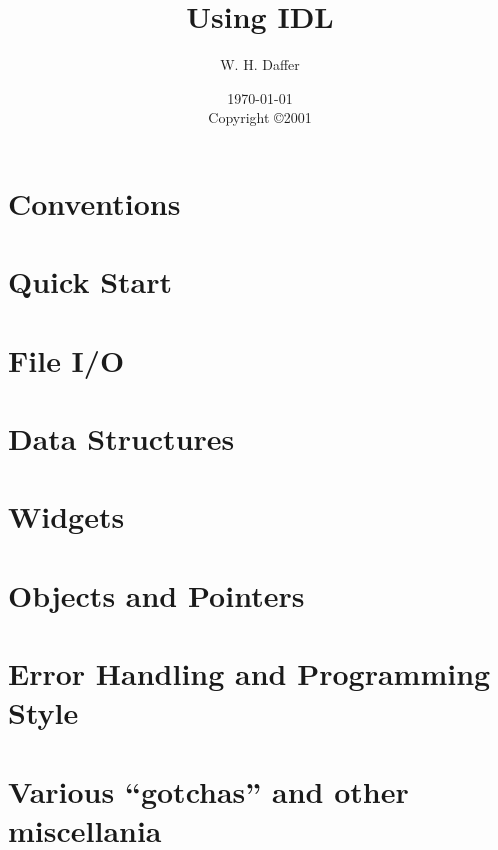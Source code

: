 \documentclass[11pt]{report}
\title{Using IDL}
\author{W. H. Daffer}
\date{\today \\
	Copyright \copyright 2001}
\begin{document}
\maketitle
\newpage

\tableofcontents

\newpage
\chapter{Conventions}

\chapter{Quick Start}

\chapter{File I/O}

\chapter{Data Structures}

\chapter{Widgets}

\chapter{Objects and Pointers}

\chapter{Error Handling and Programming Style}

\chapter{Various ``gotchas'' and other miscellania}



\end{document}

